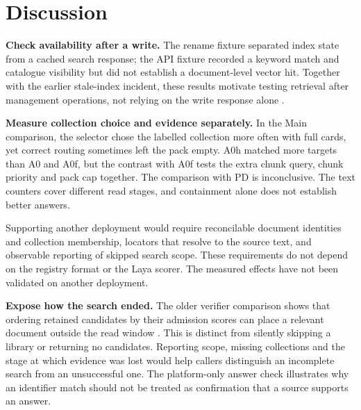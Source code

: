 \section{Discussion}
\label{sec:discussion}

\textbf{Check availability after a write.} The rename fixture
separated index state from a cached search response; the API fixture
recorded a keyword match and catalogue visibility but did not establish
a document-level vector hit.
Together with the earlier stale-index incident, these results motivate testing
retrieval after management operations, not relying on the write response alone
\citep{park-metadata-quality-2009,paivarinta-ecm-2005}.

\textbf{Measure collection choice and evidence separately.} In the Main
comparison, the selector chose the labelled collection more often with full
cards, yet correct routing sometimes left the pack empty. A0h matched more
targets than A0 and A0f, but the contrast with A0f tests the extra chunk query,
chunk priority and pack cap together. The comparison with PD is inconclusive.
The text counters cover different read stages, and containment alone does
not establish better answers.

Supporting another deployment would require reconcilable document identities
and collection membership, locators that resolve to the source text, and
observable reporting of skipped search scope. These requirements do not
depend on the registry format or the Laya scorer. The measured effects have
not been validated on another deployment.

\textbf{Expose how the search ended.} The older verifier comparison shows
that ordering retained candidates by their admission scores can place a
relevant document outside the read window \citep{zheng-llmjudge,sun-urara}.
This is distinct from silently skipping a library or returning no candidates.
Reporting scope, missing collections and the stage at which evidence was lost
would help callers distinguish an incomplete search from an unsuccessful one.
The platform-only answer check illustrates why an identifier match should not
be treated as confirmation that a source supports an answer.
